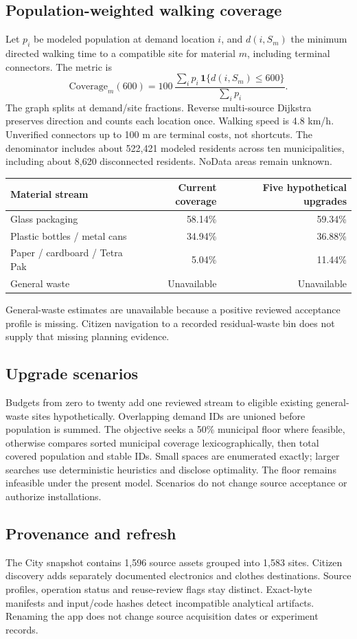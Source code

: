 \documentclass[10pt,a4paper]{article}
\begin{document}
\subsection{Population-weighted walking coverage}
Let $p_i$ be modeled population at demand location $i$, and $d(i,S_m)$ the minimum directed walking time to a compatible site for material $m$, including terminal connectors. The metric is
\[
\mathrm{Coverage}_m(600)=100\,\frac{\sum_i p_i\,\mathbf{1}\{d(i,S_m)\leq600\}}{\sum_i p_i}.
\]
The graph splits at demand/site fractions. Reverse multi-source Dijkstra preserves direction and counts each location once. Walking speed is 4.8 km/h. Unverified connectors up to 100 m are terminal costs, not shortcuts. The denominator includes about 522,421 modeled residents across ten municipalities, including about 8,620 disconnected residents. NoData areas remain unknown.
\begin{center}
\small
\begin{tabularx}{\linewidth}{Xrr}
\toprule
Material stream & Current coverage & Five hypothetical upgrades \\
\midrule
Glass packaging & 58.14\% & 59.34\% \\
Plastic bottles / metal cans & 34.94\% & 36.88\% \\
Paper / cardboard / Tetra Pak & 5.04\% & 11.44\% \\
General waste & Unavailable & Unavailable \\
\bottomrule
\end{tabularx}
\end{center}
General-waste estimates are unavailable because a positive reviewed acceptance profile is missing. Citizen navigation to a recorded residual-waste bin does not supply that missing planning evidence.
\subsection{Upgrade scenarios}
Budgets from zero to twenty add one reviewed stream to eligible existing general-waste sites hypothetically. Overlapping demand IDs are unioned before population is summed. The objective seeks a 50\% municipal floor where feasible, otherwise compares sorted municipal coverage lexicographically, then total covered population and stable IDs. Small spaces are enumerated exactly; larger searches use deterministic heuristics and disclose optimality. The floor remains infeasible under the present model. Scenarios do not change source acceptance or authorize installations.
\subsection{Provenance and refresh}
The City snapshot contains 1,596 source assets grouped into 1,583 sites. Citizen discovery adds separately documented electronics and clothes destinations. Source profiles, operation status and reuse-review flags stay distinct. Exact-byte manifests and input/code hashes detect incompatible analytical artifacts. Renaming the app does not change source acquisition dates or experiment records.
\end{document}
